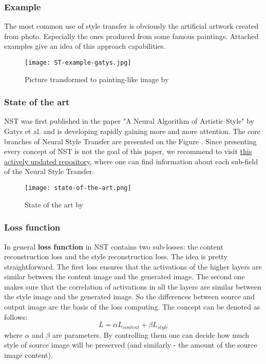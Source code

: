 \documentclass[../Main.tex]{subfiles}
\begin{document}
        
\newpage
    
    \subsubsection{Example}
    The most common use of style transfer is obviously the artificial artwork created from photo. Especially the ones produced from some famous paintings. Attached examples give an idea of this approach capabilities. \\
    \begin{figure}[h!]
        \centering
        \texttt{[image: ST-example-gatys.jpg]}
        \caption{Picture transformed to painting-like image by \cite{gatys2015neural}}
        \label{fig:ST-example-gatys}
    \end{figure}

    \subsubsection{State of the art}
    NST was first published in the paper "A Neural Algorithm of Artistic Style" by Gatys et al.  and is developing rapidly gaining more and more attention. The core branches of Neural Style Transfer are presented on the Figure . Since presenting every concept of NST is not the goal of this paper, we recommend to visit \href{https://github.com/ycjing/Neural-Style-Transfer-Papers}{this actively updated repository}, where one can find information about each sub-field of the Neural Style Transfer. \\
    \begin{figure}[h!]
        \centering
        \texttt{[image: state-of-the-art.png]}
        \caption{State of the art by }
        \label{fig:state-of-the-art}
    \end{figure}
    
    \subsubsection{Loss function}
    In general \textbf{loss function} in NST contains two sub-losses: the content reconstruction loss and the style reconstruction loss. The idea is pretty straightforward. The first loss ensures that the activations of the higher layers are similar between the content image and the generated image. The second one makes sure that the correlation of activations in all the layers are similar between the style image and the generated image. So the differences between source and output image are the basis of the loss computing.
    The concept can be denoted as follows:
    \[L= \alpha L_{content} + \beta L_{style}\]
    where $\alpha$ and $\beta$ are parameters. By controlling them one can decide how much style of source image will be preserved (and similarly - the amount of the source image content). 
    
\end{document}

